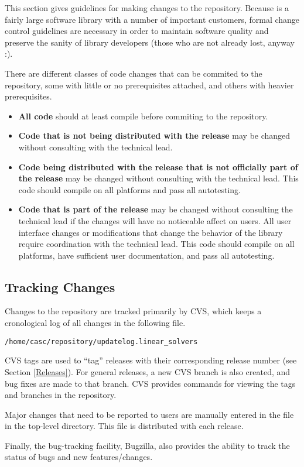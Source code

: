 This section gives guidelines for making changes to the repository.
Because \hypre{} is a fairly large software library with a number of
important customers, formal change control guidelines are necessary in
order to maintain software quality and preserve the sanity of library
developers (those who are not already lost, anyway :).

There are different classes of code changes that can be commited to
the repository, some with little or no prerequisites attached, and
others with heavier prerequisites.
\begin{itemize}

\item {\bf All code} should at least compile before commiting
to the repository.

\item {\bf Code that is not being distributed with the release}
may be changed without consulting with the \hypre{} technical lead.

\item {\bf Code being distributed with the release that is not officially
part of the release} may be changed without consulting with the
\hypre{} technical lead.  This code should compile on all platforms
and pass all autotesting.

\item {\bf Code that is part of the release} may be changed without
consulting the \hypre{} technical lead if the changes will have no
noticeable affect on users.  All user interface changes or
modifications that change the behavior of the library require
coordination with the \hypre{} technical lead.  This code should
compile on all platforms, have sufficient user documentation, and pass
all autotesting.

\end{itemize}


\subsection{Tracking Changes}
\label{Tracking Changes}

Changes to the repository are tracked primarily by CVS, which keeps a
cronological log of all changes in the following file.
\begin{verbatim}
/home/casc/repository/updatelog.linear_solvers
\end{verbatim}

CVS tags are used to ``tag'' releases with their corresponding release
number (see Section \ref{Releases}).  For general releases, a new CVS
branch is also created, and bug fixes are made to that branch.  CVS
provides commands for viewing the tags and branches in the repository.

Major changes that need to be reported to users are manually entered
in the  file in the top-level directory.  This file is
distributed with each \hypre{} release.

Finally, the \hypre{} bug-tracking facility, Bugzilla, also provides
the ability to track the status of bugs and new features/changes.
